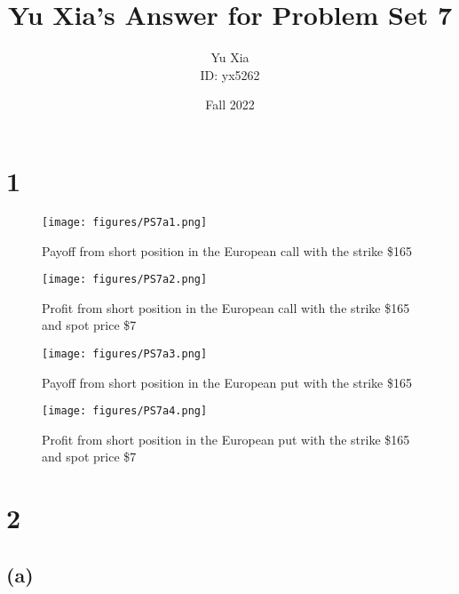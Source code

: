 \documentclass{article}
\author{Yu Xia \\ ID: yx5262}
\title{Yu Xia's Answer for Problem Set 7}
\date{Fall 2022}
\begin{document}
\maketitle

\nocite{*}

\section*{1}

\begin{figure}[H]
    \begin{center}
        \texttt{[image: figures/PS7a1.png]}
    \end{center}
    \caption{Payoff from short position in the European call with the strike \$165}
    \label{fig:graph}
\end{figure}

\begin{figure}[H]
    \begin{center}
        \texttt{[image: figures/PS7a2.png]}
    \end{center}
    \caption{Profit from short position in the European call with the strike \$165 and spot price \$7}
    \label{fig:graph}
\end{figure}

\begin{figure}[H]
    \begin{center}
        \texttt{[image: figures/PS7a3.png]}
    \end{center}
    \caption{Payoff from short position in the European put with the strike \$165}
    \label{fig:graph}
\end{figure}

\begin{figure}[H]
    \begin{center}
        \texttt{[image: figures/PS7a4.png]}
    \end{center}
    \caption{Profit from short position in the European put with the strike \$165 and spot price \$7}
    \label{fig:graph}
\end{figure}


\section*{2}

\subsection*{(a)}
\end{document}
